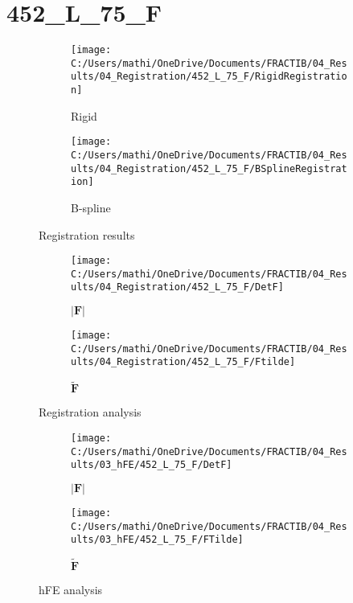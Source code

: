 \documentclass{article}%
\begin{document}
%
\newpage%
\section*{452\_L\_75\_F}%
\label{sec:452L75F}%


\begin{figure}[h!]%
\begin{subfigure}[b]{0.5\linewidth}%
\texttt{[image: C:/Users/mathi/OneDrive/Documents/FRACTIB/04\_Results/04\_Registration/452\_L\_75\_F/RigidRegistration]}%
\caption{Rigid}%
\end{subfigure}%
\begin{subfigure}[b]{0.5\linewidth}%
\texttt{[image: C:/Users/mathi/OneDrive/Documents/FRACTIB/04\_Results/04\_Registration/452\_L\_75\_F/BSplineRegistration]}%
\caption{B{-}spline}%
\end{subfigure}%
\caption{Registration results}%
\end{figure}

%


\begin{figure}[h!]%
\begin{subfigure}[b]{0.5\linewidth}%
\texttt{[image: C:/Users/mathi/OneDrive/Documents/FRACTIB/04\_Results/04\_Registration/452\_L\_75\_F/DetF]}%
\caption{$|\mathbf{F}|$}%
\end{subfigure}%
\begin{subfigure}[b]{0.5\linewidth}%
\texttt{[image: C:/Users/mathi/OneDrive/Documents/FRACTIB/04\_Results/04\_Registration/452\_L\_75\_F/Ftilde]}%
\caption{$\tilde{\mathbf{F}}$}%
\end{subfigure}%
\caption{Registration analysis}%
\end{figure}

%


\begin{figure}[h!]%
\begin{subfigure}[b]{0.5\linewidth}%
\texttt{[image: C:/Users/mathi/OneDrive/Documents/FRACTIB/04\_Results/03\_hFE/452\_L\_75\_F/DetF]}%
\caption{$|\mathbf{F}|$}%
\end{subfigure}%
\begin{subfigure}[b]{0.5\linewidth}%
\texttt{[image: C:/Users/mathi/OneDrive/Documents/FRACTIB/04\_Results/03\_hFE/452\_L\_75\_F/FTilde]}%
\caption{$\tilde{\mathbf{F}}$}%
\end{subfigure}%
\caption{hFE analysis}%
\end{figure}
\end{document}
